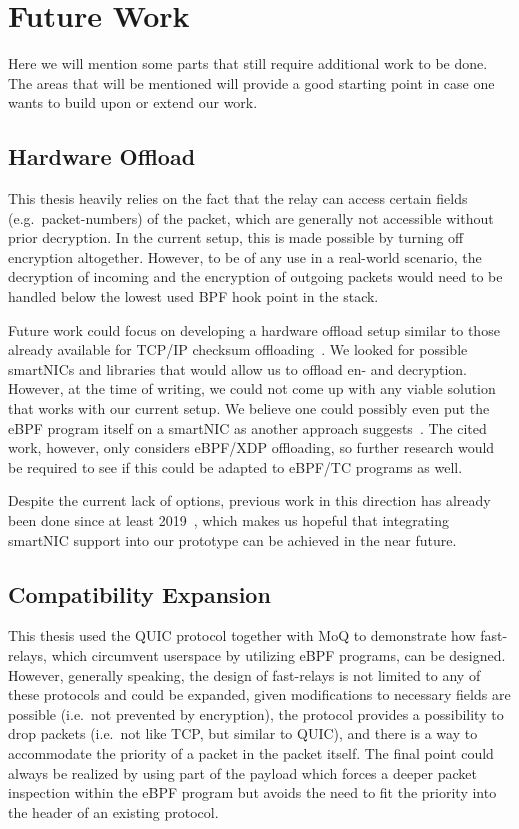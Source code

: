 \section{Future Work}\label{sec:future_work}

Here we will mention some parts that still require additional work 
to be done.
The areas that will be mentioned will provide a good starting point
in case one wants to build upon or extend our work.

\subsection{Hardware Offload}
This thesis heavily relies on the fact that the relay can
access certain fields (e.g.~packet-numbers) of the packet, 
which are generally not accessible without prior decryption.
In the current setup, this is made possible by turning off 
encryption altogether.
However, to be of any use in a real-world
scenario, the decryption of incoming and the encryption of
outgoing packets would need to be handled below the lowest 
used BPF hook point in the stack.

Future work could focus on developing a hardware offload 
setup similar to those already available for TCP/IP checksum 
offloading~\parencite{tcp-ip-offload-engine}.
We looked for possible smartNICs and libraries that would allow us
to offload en- and decryption.
However, at the time of writing, we could not come up with any viable solution
that works with our current setup. 
We believe one could possibly even put the eBPF program itself on a smartNIC as 
another approach suggests~\parencite{ebpf-offload-smartnics}.
The cited work, however, only considers eBPF/XDP offloading, so further 
research would be required to see if this could be adapted to eBPF/TC 
programs as well.

Despite the current lack of options, previous work in this direction has already been 
done since at least 2019~\parencite{quic-nic-offload}, which makes us hopeful that
integrating smartNIC support into our prototype can be achieved in the near future.

\subsection{Compatibility Expansion}\label{sec:compatibility_expansion}
This thesis used the QUIC protocol together with MoQ to demonstrate how fast-relays, 
which circumvent userspace by utilizing eBPF programs, can be designed.
However, generally speaking, the design of fast-relays is not limited to
any of these protocols and could be expanded, given modifications to 
necessary fields are possible (i.e.~not prevented by encryption),
the protocol provides a possibility to drop packets (i.e.~not like TCP, 
but similar to QUIC),
and there is a way to accommodate the priority of a packet in the packet itself.
The final point could always be realized by using part of the payload
which forces a deeper packet inspection within the eBPF program but 
avoids the need to fit the priority into the header of an existing 
protocol.

